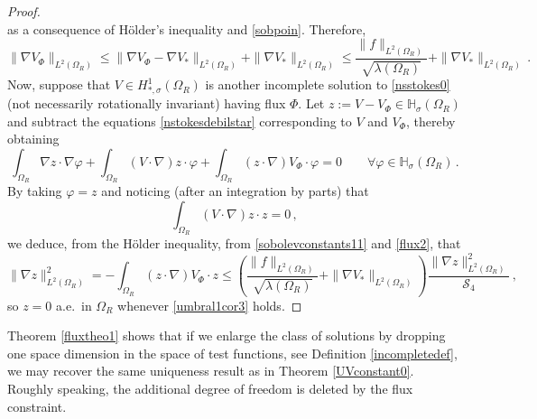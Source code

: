 \documentclass[a4paper,11pt]{article}
\numberwithin{equation}{section}
\numberwithin{figure}{section}
\begin{document}
\begin{proof}
$$$$
as a consequence of H\"older's inequality and \eqref{sobpoin}. Therefore,
\begin{equation} \label{flux2}
\| \nabla V_{\Phi} \|_{L^{2}(\Omega_{R})} \leq \| \nabla V_{\Phi} - \nabla V_{*} \|_{L^{2}(\Omega_{R})} + \| \nabla V_{*} \|_{L^{2}(\Omega_{R})}
\leq \dfrac{\|f\|_{L^2(\Omega_{R})}}{\sqrt{\lambda(\Omega_{R})}} + \| \nabla V_{*} \|_{L^{2}(\Omega_{R})} \, .
\end{equation}
Now, suppose that $V \in H^{1}_{*,\sigma}(\Omega_{R})$ is another incomplete solution to  \eqref{nsstokes0} (not necessarily rotationally
invariant) having flux $\Phi$. Let $z := V - V_{\Phi} \in \mathbb{H}_{\sigma}(\Omega_{R})$ and subtract the equations
\eqref{nstokesdebilstar} corresponding to $V$ and $V_{\Phi}$, thereby obtaining
$$
\int_{\Omega_{R}} \nabla z \cdot \nabla \varphi + \int_{\Omega_{R}} (V \cdot \nabla) z \cdot \varphi + \int_{\Omega_{R}} (z \cdot \nabla) V_{\Phi}
\cdot \varphi = 0 \qquad \forall \varphi \in \mathbb{H}_{\sigma}(\Omega_{R}) \, .
$$
By taking $\varphi=z$ and noticing (after an integration by parts) that
$$
\int_{\Omega_{R}} (V \cdot \nabla) z \cdot z = 0 \, ,
$$
we deduce, from the H\"older inequality, from \eqref{sobolevconstants11} and \eqref{flux2}, that
$$
\|\nabla z\|^2_{L^2(\Omega_{R})} = - \int_{\Omega_{R}} (z \cdot \nabla)  V_{\Phi} \cdot z \leq \left(
\dfrac{\|f\|_{L^2(\Omega_{R})}}{\sqrt{\lambda(\Omega_{R})}} + \| \nabla V_{*} \|_{L^{2}(\Omega_{R})} \right) \frac{\|\nabla
z\|^2_{L^2(\Omega_{R})}}{\mathcal{S}_4}  \, ,
$$
so $z = 0$ a.e.\ in $\Omega_{R}$ whenever \eqref{umbral1cor3} holds.
\end{proof}

Theorem \ref{fluxtheo1} shows that if we enlarge the class of solutions by dropping one space dimension in the space of test functions,
see Definition \ref{incompletedef}, we may recover the same uniqueness result as in Theorem \ref{UVconstant0}. Roughly speaking, the additional
degree of freedom is deleted by the flux constraint.

\newpage
\end{document}

